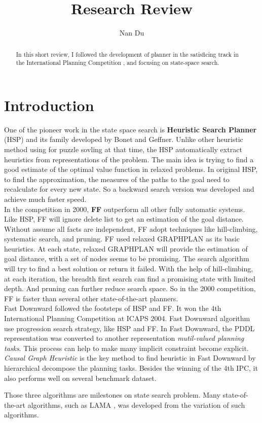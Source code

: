 \documentclass[]{article}
\title{Research Review}
\author{Nan Du}
\begin{document}
\maketitle

\begin{abstract}
In this short review, I followed the development of planner in the satisficing track in the International Planning Competition \cite{coles2012survey}, and focusing on state-space search.
\end{abstract}

\section{Introduction}

One of the pioneer work in the state space search is \textbf{Heuristic Search Planner} (HSP) and its family developed by Bonet and Geffner\cite{bonet1999HSP}. Unlike other heuristic method using for puzzle sovling at that time, the HSP automatically extract heuristics from representations of the problem. The main idea is trying to find a good estimate of the optimal value function in relaxed problems. In original HSP, to find the approximation, the measures of the paths to the goal need to recalculate for every new state. So a backward search version was developed and achieve much faster speed.\\

In the competition in 2000, \textbf{FF} \cite{hoffmann2001ff} outperform all other fully automatic systems. Like HSP, FF will ignore delete list to get an estimation of the goal distance. Without assume all facts are independent, FF adopt techniques like hill-climbing, systematic search, and pruning. FF used relaxed GRAPHPLAN as its basic heuristics. At each state, relaxed GRAPHPLAN will provide the estimation of goal distance, with a set of nodes seems to be promising. The search algorithm will try to find a best solution or return it failed. With the help of hill-climbing, at each iteration, the breadth first search can find a promising state with limited depth. And pruning can further reduce search space. So in the 2000 competition, FF is faster than several other state-of-the-art planners.\\

Fast Downward \cite{helmert2006fastdownward} followed the footsteps of HSP and FF. It won the 4th International Planning Competition at ICAPS 2004. Fast Downward algorithm use progression search strategy, like HSP and FF. In Fast Downward, the PDDL representation was converted to another representation \textit{mutil-valued planning tasks}. This process can help to make many implicit constraint become explicit. \textit{Causal Graph Heuristic} is the key method to find heuristic in Fast Downward by hierarchical decompose the planning tasks. Besides the winning of the 4th IPC, it also performs well on several benchmark dataset.

Those three algorithms are milestones on state search problem. Many state-of-the-art algorithms, such as LAMA \cite{richter2010lama}, was developed from the variation of such algorithms.



\end{document}
